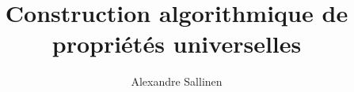 \documentclass[10pt,a4paper]{article}
\author{Alexandre Sallinen}
\title{Construction algorithmique de propriétés universelles}
\begin{document}
\maketitle
\pagebreak
\end{document}
